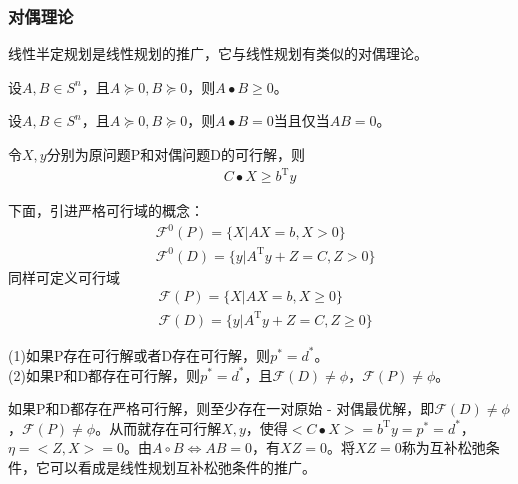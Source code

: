         \subsubsection{对偶理论}
            \par
            线性半定规划是线性规划的推广，它与线性规划有类似的对偶理论。
            \begin{lemma}[1]
            设$A,B\in S^n$，且$A\succeq 0,B \succeq 0$，则$A\bullet B\geqslant 0$。
            \end{lemma}
            \begin{lemma}[2]
            设$A,B\in S^n$，且$A\succeq 0,B \succeq 0$，则$A\bullet B= 0$当且仅当$AB=0$。
            \end{lemma}
            \begin{theorem}[弱对偶定理]
            令$X,y$分别为原问题P和对偶问题D的可行解，则
            \begin{align*}
               C \bullet X \geqslant b^\mathrm{T} y
            \end{align*}
            \end{theorem}
            \par
            下面，引进严格可行域的概念：
            \begin{align*}
            & {\mathscr{F}}^0(P)=\{X|AX=b,X>0\} \\
            & {\mathscr{F}}^0(D)=\{y|A^\mathrm{T} y+Z=C,Z>0\}
            \end{align*}
            同样可定义可行域
            \begin{align*}
              & {\mathscr{F}}(P)=\{X|AX=b,X\geqslant 0\}\\
              & {\mathscr{F}}(D)=\{y|A^\mathrm{T} y+Z=C,Z \geqslant 0\}
            \end{align*}
            \begin{theorem}[强对偶定理]
            (1)如果P存在可行解或者D存在可行解，则$p^*=d^*$。\\
            (2)如果P和D都存在可行解，则$p^*=d^*$，且${\mathscr{F}}(D)\neq \phi$，${\mathscr{F}}(P)\neq \phi$。
            \end{theorem}
            \par
            如果P和D都存在严格可行解，则至少存在一对原始 - 对偶最优解，即${\mathscr{F}}(D)\neq \phi$，${\mathscr{F}}(P)\neq \phi$。从而就存在可行解$X,y$，使得$\big<{C\bullet X}\big>=b^\mathrm{T} y=p^*=d^*$，$\eta=\big<{Z, X}\big>=0$。由$A\circ B \Leftrightarrow AB = 0$，有$XZ=0$。将$XZ=0$称为互补松弛条件，它可以看成是线性规划互补松弛条件的推广。
